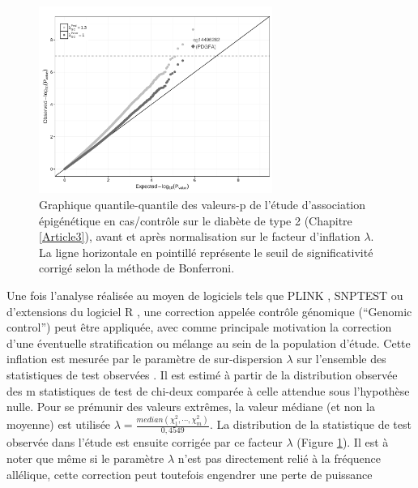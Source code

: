 \documentclass[11pt,a4paper,notrimn]{krantz}
\theoremstyle{definition}
\theoremstyle{definition}
\theoremstyle{remark}
\begin{document}
\begin{figure}[!htb]

{\centering \includegraphics[width=3in,height=2.4in]{FiguresTables/Figure1_A} 

}

\caption{Graphique quantile-quantile des valeurs-p de l'étude
d'association épigénétique en cas/contrôle sur le diabète de type 2
(Chapitre \ref{Article3}), avant et après normalisation sur le facteur
d'inflation \(\lambda\). La ligne horizontale en pointillé représente le
seuil de significativité corrigé selon la méthode de Bonferroni.}\label{fig:lambda}
\end{figure}

Une fois l'analyse réalisée au moyen de logiciels tels que PLINK
\citep{chang_second-generation_2015, purcell_plink_2015}, SNPTEST
\citep{burton_genome-wide_2007, clark_conjuring_2007} ou d'extensions du
logiciel R \citep{huber_orchestrating_2015}, une correction appelée
contrôle génomique (``Genomic control'') peut être appliquée, avec comme
principale motivation la correction d'une éventuelle stratification ou
mélange au sein de la population d'étude. Cette inflation est mesurée
par le paramètre de sur-dispersion \(\lambda\) sur l'ensemble des
statistiques de test observées \citep{devlin_genomic_1999}. Il est
estimé à partir de la distribution observée des m statistiques de test
de chi-deux comparée à celle attendue sous l'hypothèse nulle. Pour se
prémunir des valeurs extrêmes, la valeur médiane (et non la moyenne) est
utilisée \(\lambda=\frac{median(\chi^2_1, \cdots, \chi^2_m)}{0,4549}\).
La distribution de la statistique de test observée dans l'étude est
ensuite corrigée par ce facteur \(\lambda\) (Figure \ref{fig:lambda}).
Il est à noter que même si le paramètre \(\lambda\) n'est pas
directement relié à la fréquence allélique, cette correction peut
toutefois engendrer une perte de puissance
\citep{georgiopoulos_power_2016}
\end{document}
